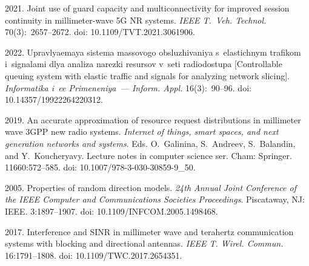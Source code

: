   \begin{multicols}{2}

\renewcommand{\bibname}{\protect\rmfamily References}

{\small\frenchspacing
 {\baselineskip=10.8pt
 \begin{thebibliography}{9} 
 2021. Joint use of guard capacity and multiconnectivity for improved session continuity in millimeter-wave 5G NR systems. \textit{IEEE T.~Veh. Technol.}
  70(3):~2657--2672. doi: 10.1109/TVT.2021.3061906.

 2022. 
Up\-rav\-lya\-emaya sis\-te\-ma mas\-so\-vo\-go ob\-slu\-zhi\-va\-niya s~elas\-tich\-nym tra\-fi\-kom 
i~sig\-na\-la\-mi dlya ana\-li\-za na\-rez\-ki re\-sur\-sov v~se\-ti ra\-dio\-do\-stu\-pa 
[Controllable queuing system with elastic traffic and signals for analyzing network slicing]. \textit{Informatika i~ee Primeneniya~--- Inform. Appl.} 
16(3):~90--96. doi: 10.14357/19922264220312.

 2019. An accurate approximation of resource request distributions in millimeter wave 3GPP new radio systems. 
 \textit{Internet of things, smart spaces, and next generation networks and systems}. Eds. O.~Galinina, S.~Andreev, S.~Balandin, and Y.~Koucheryavy. 
Lecture notes in computer science ser. Cham: Springer. 11660:572--585. doi: 10.1007/978-3-030-30859-9\_50.

 2005. Properties of random direction models. \textit{24th Annual Joint Conference of the IEEE Computer and Communications Societies Proceedings}. 
 Piscataway, NJ: IEEE. 3:1897--1907. doi: 10.1109/\linebreak INFCOM.2005.1498468.
 
 

 2017. Interference and SINR in millimeter wave and terahertz communication systems with blocking and directional antennas. 
 \textit{IEEE T. Wirel. Commun.} 16:1791--1808. doi: 10.1109/TWC.2017.2654351.


\end{thebibliography}}}
\end{multicols}
